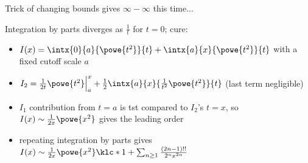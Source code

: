 \documentclass[english, parskip=full]{scrbook}
\newcommand{\example}[3]{\begin{tcolorbox}[colback=colorbackgroundexample,colframe=colorexample, breakable,enhanced,title={\textbf{#1}: #2.}]#3\end{tcolorbox}}
\begin{document}
\example{Imaginary Error Function}{$I(x) = \intx{0}{x}{\powe{t^2}}{t}$ as $x\rightarrow \infty$}{Trick of changing bounds gives $\infty - \infty$ this time...

Integration by parts diverges as $\frac{1}{t}$ for $t=0$; cure:
\begin{itemize}
\item $I(x) = \intx{0}{a}{\powe{t^2}}{t} + \intx{a}{x}{\powe{t^2}}{t}$ with a fixed cutoff scale $a$
\item $I_2 = \frac{1}{2t} \powe{t^2}\Big\vert_a^x + \frac{1}{2} \intx{a}{x}{\frac{1}{t^2} \powe{t^2}}{t}$ (last term negligible)
\item $I_1$ contribution from $t=a$ is \gls{tst} compared to $I_2$'s $t=x$, so $I(x) \sim \frac{1}{2x} \powe{x^2}$ gives the leading order
\item repeating integration by parts gives $I(x) \sim \frac{1}{2x}\powe{x^2} \klc*{1 + \sum_{n\ge 1}\frac{(2n-1)!!}{2^n x^{2n}}}$
\end{itemize}
}
\end{document}
